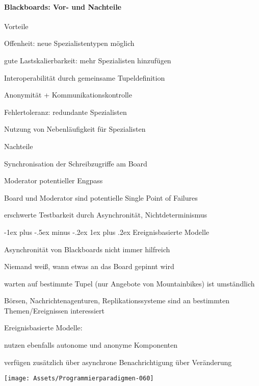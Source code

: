 \documentclass[10pt]{article}
\makeatletter
\renewcommand{\subsubsection}{\@startsection{subsubsection}{3}{0mm}%
                                {-1ex plus -.5ex minus -.2ex}%
                                {1ex plus .2ex}%
                                {\normalfont\small\bfseries}}
\makeatother
\begin{document}
\paragraph{Blackboards: Vor- und Nachteile}
\begin{itemize*}
  \item Vorteile
  \begin{itemize*}
    \item Offenheit: neue Spezialistentypen möglich
    \item gute Lastskalierbarkeit: mehr Spezialisten hinzufügen
    \item Interoperabilität durch gemeinsame Tupeldefinition
    \item Anonymität + Kommunikationskontrolle
    \item Fehlertoleranz: redundante Spezialisten
    \item Nutzung von Nebenläufigkeit für Spezialisten
  \end{itemize*}
  \item Nachteile
  \begin{itemize*}
    \item Synchronisation der Schreibzugriffe am Board
    \item Moderator potentieller Engpass
    \item Board und Moderator sind potentielle Single Point of Failures
    \item erschwerte Testbarkeit durch Asynchronität, Nichtdeterminismus
  \end{itemize*}
\end{itemize*}

\subsubsection{Ereignisbasierte Modelle}
\begin{itemize*}
  \item Asynchronität von Blackboards nicht immer hilfreich
  \begin{itemize*}
    \item Niemand weiß, wann etwas an das Board gepinnt wird
    \item warten auf bestimmte Tupel (nur Angebote von Mountainbikes) ist umständlich
  \end{itemize*}
  \item Börsen, Nachrichtenagenturen, Replikationssysteme sind an bestimmten Themen/Ereignissen interessiert
  \item Ereignisbasierte Modelle:
  \begin{itemize*}
    \item nutzen ebenfalls autonome und anonyme Komponenten
    \item verfügen zusätzlich über asynchrone Benachrichtigung über Veränderung
  \end{itemize*}
\end{itemize*}
\begin{center}
  \centering
  \texttt{[image: Assets/Programmierparadigmen-060]}
\end{center}
\end{document}
